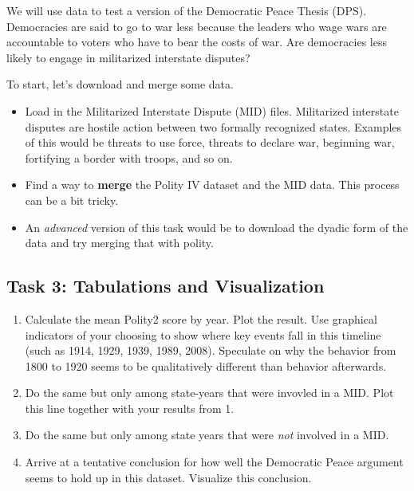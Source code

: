 \documentclass[]{book}
\providecommand{\tightlist}{%
  \setlength{\itemsep}{0pt}\setlength{\parskip}{0pt}}
\theoremstyle{definition}
\theoremstyle{definition}
\theoremstyle{definition}
\theoremstyle{remark}
\begin{document}
We will use data to test a version of the Democratic Peace Thesis (DPS).
Democracies are said to go to war less because the leaders who wage wars
are accountable to voters who have to bear the costs of war. Are
democracies less likely to engage in militarized interstate disputes?

To start, let's download and merge some data.

\begin{itemize}
\tightlist
\item
  Load in the Militarized Interstate Dispute (MID) files. Militarized
  interstate disputes are hostile action between two formally recognized
  states. Examples of this would be threats to use force, threats to
  declare war, beginning war, fortifying a border with troops, and so
  on.
\item
  Find a way to \textbf{merge} the Polity IV dataset and the MID data.
  This process can be a bit tricky.
\item
  An \emph{advanced} version of this task would be to download the
  dyadic form of the data and try merging that with polity.
\end{itemize}

\subsection*{Task 3: Tabulations and
Visualization}\label{task-3-tabulations-and-visualization}

\begin{enumerate}
\def\labelenumi{\arabic{enumi}.}
\tightlist
\item
  Calculate the mean Polity2 score by year. Plot the result. Use
  graphical indicators of your choosing to show where key events fall in
  this timeline (such as 1914, 1929, 1939, 1989, 2008). Speculate on why
  the behavior from 1800 to 1920 seems to be qualitatively different
  than behavior afterwards.
\item
  Do the same but only among state-years that were invovled in a MID.
  Plot this line together with your results from 1.
\item
  Do the same but only among state years that were \emph{not} involved
  in a MID.
\item
  Arrive at a tentative conclusion for how well the Democratic Peace
  argument seems to hold up in this dataset. Visualize this conclusion.
\end{enumerate}
\end{document}
